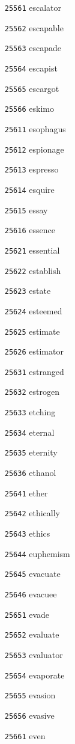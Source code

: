 \documentclass[twoside,11pt]{article}
\begin{document}
\begin{multicols}{5}
\begin{enumerate}
\item[\texttt{25561}] escalator
\item[\texttt{25562}] escapable
\item[\texttt{25563}] escapade
\item[\texttt{25564}] escapist
\item[\texttt{25565}] escargot
\item[\texttt{25566}] eskimo
\item[\texttt{25611}] esophagus
\item[\texttt{25612}] espionage
\item[\texttt{25613}] espresso
\item[\texttt{25614}] esquire
\item[\texttt{25615}] essay
\item[\texttt{25616}] essence
\item[\texttt{25621}] essential
\item[\texttt{25622}] establish
\item[\texttt{25623}] estate
\item[\texttt{25624}] esteemed
\item[\texttt{25625}] estimate
\item[\texttt{25626}] estimator
\item[\texttt{25631}] estranged
\item[\texttt{25632}] estrogen
\item[\texttt{25633}] etching
\item[\texttt{25634}] eternal
\item[\texttt{25635}] eternity
\item[\texttt{25636}] ethanol
\item[\texttt{25641}] ether
\item[\texttt{25642}] ethically
\item[\texttt{25643}] ethics
\item[\texttt{25644}] euphemism
\item[\texttt{25645}] evacuate
\item[\texttt{25646}] evacuee
\item[\texttt{25651}] evade
\item[\texttt{25652}] evaluate
\item[\texttt{25653}] evaluator
\item[\texttt{25654}] evaporate
\item[\texttt{25655}] evasion
\item[\texttt{25656}] evasive
\item[\texttt{25661}] even

\end{enumerate}
\end{multicols}
\end{document}
